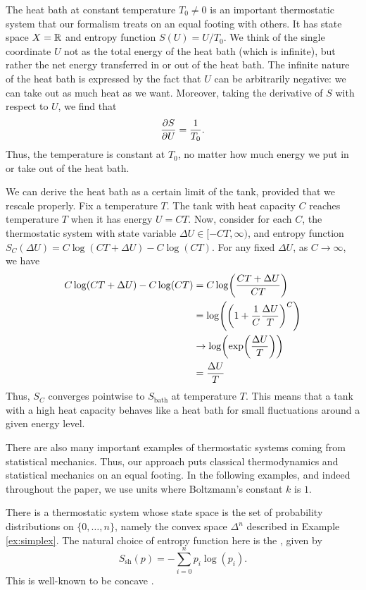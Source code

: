 \documentclass[12pt, reqno]{amsart}
\newcommand{\Ssh}{S_{\mathrm{sh}}} %
\newcommand{\Sbath}{S_{\mathrm{bath}}} %
\begin{document}
\begin{example}
\label{ex:heat_bath}
    The heat bath at constant temperature $T_0 \ne 0$ is an important thermostatic system that our formalism treats on an equal footing with others. It has state space $X = \mathbb{R}$ and entropy function $S(U) = U / T_0$. We think of the single coordinate $U$ not as the total energy of the heat bath (which is infinite), but rather the net energy transferred in or out of the heat bath. The infinite nature of the heat bath is expressed by the fact that $U$ can be arbitrarily negative: we can take out as much heat as we want. Moreover, taking the derivative of $S$ with respect to $U$, we find that
    \[ \pdv{S}{U} = \frac{1}{T_0} .\]
    Thus, the temperature is constant at $T_0$, no matter how much energy we put in or take out of the heat bath.
\end{example}

We can derive the heat bath as a certain limit of the tank, provided that we rescale properly. Fix a temperature $T$. The tank with heat capacity $C$ reaches temperature $T$ when it has energy $U = CT$. Now, consider for each $C$, the thermostatic system with state variable $\Delta U \in [-CT,\infty)$, and entropy function $S_C(\Delta U) = C\log(CT + \Delta U) - C\log(CT)$. For any fixed $\Delta U$, as $C \to \infty$, we have
\begin{align*}
    C\log(CT + \Delta U) - C\log(CT) &= C\log(\frac{CT + \Delta U}{CT}) \\
    &= \log(\qty(1 + \frac{1}{C}\frac{\Delta U}{T})^C) \\
    &\rightarrow \log(\exp(\frac{\Delta U}{T})) \\
    &= \frac{\Delta U}{T} 
\end{align*}
Thus, $S_C$ converges pointwise to $\Sbath$ at temperature $T$. This means that a tank with a high heat capacity behaves like a heat bath for small fluctuations around a given energy level.

There are also many important examples of thermostatic systems coming from statistical mechanics. Thus, our approach puts classical thermodynamics and statistical mechanics on an equal footing. In the following examples, and indeed throughout the paper, we use units where Boltzmann's constant $k$ is $1$. 

\begin{example}
\label{ex:Shannon}
    There is a thermostatic system whose state space is the set of probability distributions on $\{0,\dots, n\}$, namely the convex space $\Delta^n$ described in Example \ref{ex:simplex}. The natural choice of entropy function here is the , given by
    \[ \Ssh(p) = -\sum_{i=0}^n p_i \log(p_i). \]
    This is well-known to be concave \cite[Thm.\ 2.73]{CoverThomas}.
\end{example}
\end{document}
